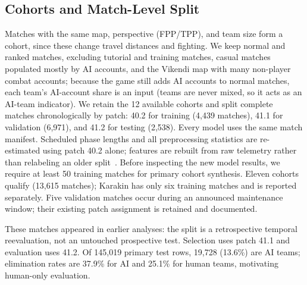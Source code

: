 \documentclass[sigconf,anonymous,nonacm]{acmart}
\begin{document}
\subsection{Cohorts and Match-Level Split}
\label{sec:method:cohort}
Matches with the same map, perspective (FPP/TPP), and team size form a cohort, since these change travel distances and fighting.
We keep normal and ranked matches, excluding tutorial and training matches, casual matches populated mostly by AI accounts, and the Vikendi map with many non-player combat accounts; because the game still adds AI accounts to normal matches, each team's AI-account share is an input (teams are never mixed, so it acts as an AI-team indicator).
We retain the 12 available cohorts and split complete matches chronologically by patch: 40.2 for training (4,439 matches), 41.1 for validation (6,971), and 41.2 for testing (2,538). Every model uses the same match manifest. Scheduled phase lengths and all preprocessing statistics are re-estimated using patch 40.2 alone; features are rebuilt from raw telemetry rather than relabeling an older split~\cite{Kaufman12}. Before inspecting the new model results, we require at least 50 training matches for primary cohort synthesis. Eleven cohorts qualify (13,615 matches); Karakin has only six training matches and is reported separately. Five validation matches occur during an announced maintenance window; their existing patch assignment is retained and documented.

These matches appeared in earlier analyses: the split is a retrospective temporal reevaluation, not an untouched prospective test. Selection uses patch 41.1 and evaluation uses 41.2. Of 145,019 primary test rows, 19,728 (13.6\%) are AI teams; elimination rates are 37.9\% for AI and 25.1\% for human teams, motivating human-only evaluation.
\end{document}

